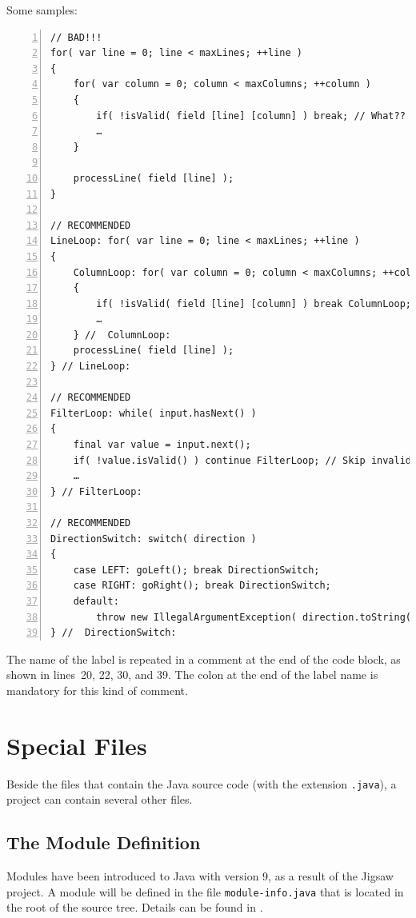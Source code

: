 \documentclass[12pt,a4paper,titlepage, parskip=half, headsepline, footsepline, cleardoubleplain]{scrbook}
\begin{document}
Some samples:
\begin{lstlisting}[numbers=left]
// BAD!!!
for( var line = 0; line < maxLines; ++line )
{
    for( var column = 0; column < maxColumns; ++column )
    {
        if( !isValid( field [line] [column] ) break; // What??
        …
    }

    processLine( field [line] );
}

// RECOMMENDED
LineLoop: for( var line = 0; line < maxLines; ++line )
{
    ColumnLoop: for( var column = 0; column < maxColumns; ++column )
    {
        if( !isValid( field [line] [column] ) break ColumnLoop;
        …
    } //  ColumnLoop:
    processLine( field [line] );
} // LineLoop:

// RECOMMENDED
FilterLoop: while( input.hasNext() )
{
    final var value = input.next();
    if( !value.isValid() ) continue FilterLoop; // Skip invalid
    …
} // FilterLoop:

// RECOMMENDED
DirectionSwitch: switch( direction )
{
    case LEFT: goLeft(); break DirectionSwitch;
    case RIGHT: goRight(); break DirectionSwitch;
    default:
        throw new IllegalArgumentException( direction.toString() );
} //  DirectionSwitch:
\end{lstlisting}

The name of the label is repeated in a comment at the end of the code block, as shown in lines~20, 22, 30, and 39. The colon at the end of the label name is mandatory for this kind of comment.

\section{Special Files}
Beside the files that contain the Java source code (with the extension \verb#.java#), a project can contain several other files.

\subsection{The Module Definition}\label{sec:ModuleDefinition}
Modules have been introduced to Java with version 9, as a result of the Jigsaw project. A module will be defined in the file \verb#module-info.java# that is located in the root of the source tree. Details can be found in \autocite{ORACLE_DOC_LANGUAGE_SPECIFICATION:ModuleDeclarations}.
\end{document}

